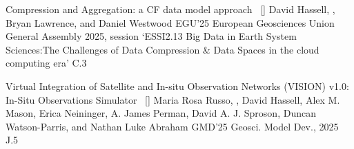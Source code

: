 
\begin{publications}

\publication
	{Compression and Aggregation: a CF data model approach}{~ [\href{https://doi.org/10.5194/egusphere-egu25-20430}{\small{\linkSymbol}}]}
	{David Hassell, \underline{}, Bryan Lawrence, and Daniel Westwood}
	{EGU'25} {European Geosciences Union General Assembly 2025, session `ESSI2.13 Big Data in Earth System Sciences:\newline The Challenges of Data Compression \& Data Spaces in the cloud computing era'} {C.3}

\publication
	{Virtual Integration of Satellite and In-situ Observation Networks (VISION) v1.0: In-Situ Observations Simulator}{~ [\href{https://gmd.copernicus.org/articles/18/181/2025/}{\small{\linkSymbol}}]}
	{Maria Rosa Russo, \underline{}, David Hassell, Alex M. Mason, Erica Neininger, A. James Perman, David A. J. Sproson, Duncan Watson-Parris, and Nathan Luke Abraham}
	{GMD'25} {Geosci. Model Dev., 2025} {J.5}

\end{publications}
